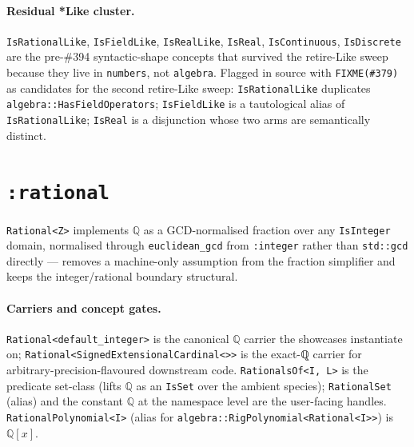 \documentclass[11pt, a4paper]{report}
\begin{document}
\paragraph{Residual *Like cluster.} \texttt{IsRationalLike}, \texttt{IsFieldLike},
\texttt{IsRealLike}, \texttt{IsReal}, \texttt{IsContinuous}, \texttt{IsDiscrete}
are the pre-\#394 syntactic-shape concepts that survived the retire-Like
sweep because they live in \texttt{numbers}, not \texttt{algebra}. Flagged
in source with \texttt{FIXME(\#379)} as candidates for the second
retire-Like sweep: \texttt{IsRationalLike} duplicates
\texttt{algebra::HasFieldOperators}; \texttt{IsFieldLike} is a tautological
alias of \texttt{IsRationalLike}; \texttt{IsReal} is a disjunction whose two
arms are semantically distinct.

\section{\texttt{:rational}}
\label{sec:numbers-rational}

\texttt{Rational<Z>} implements $\mathbb{Q}$ as a GCD-normalised fraction over
any \texttt{IsInteger} domain, normalised through \texttt{euclidean\_gcd} from
\texttt{:integer} rather than \texttt{std::gcd} directly --- removes a
machine-only assumption from the fraction simplifier and keeps the
integer/rational boundary structural.

\paragraph{Carriers and concept gates.} \texttt{Rational<default\_integer>} is
the canonical $\mathbb{Q}$ carrier the showcases instantiate on;
\texttt{Rational<SignedExtensionalCardinal<>>} is the exact-ℚ carrier for
arbitrary-precision-flavoured downstream code. \texttt{RationalsOf<I, L>} is
the predicate set-class (lifts $\mathbb{Q}$ as an \texttt{IsSet} over the
ambient species); \texttt{RationalSet} (alias) and the constant
$\mathbb{Q}$ at the namespace level are the user-facing handles.
\texttt{RationalPolynomial<I>} (alias for
\texttt{algebra::RigPolynomial<Rational<I>>}) is $\mathbb{Q}[x]$.
\end{document}
